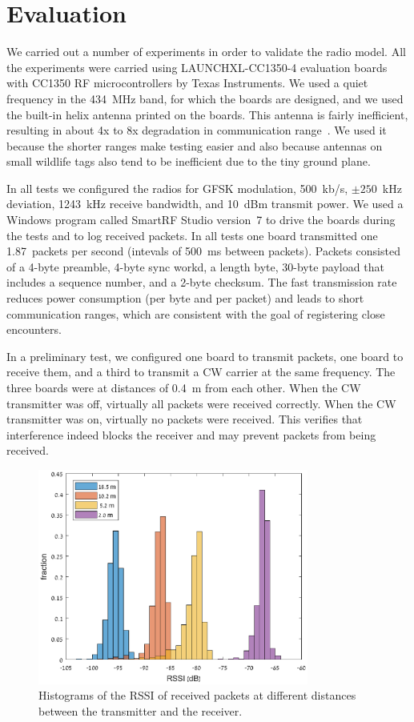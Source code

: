 \section{Evaluation}
\label{sectionsimulation}

We carried out a number of experiments in order to validate the radio model. 
All the experiments were carried using LAUNCHXL-CC1350-4 evaluation boards with CC1350 RF microcontrollers 
by Texas Instruments. We used a quiet frequency in the 434~MHz band, for which the boards are designed,
and we used the built-in helix antenna printed on the boards. This antenna is fairly inefficient, resulting
in about 4x to 8x degradation in communication range~\cite{LAUNCHXL-CC1350-4}. We used it because the shorter 
ranges make testing easier
and also because antennas on small wildlife tags also tend to be inefficient due to the tiny ground plane.

In all tests we configured the radios for GFSK modulation, 500~kb/s, $\pm 250$~kHz deviation, 1243~kHz receive bandwidth,
and 10~dBm transmit power. We used a Windows program called SmartRF Studio version~7 to drive the boards during
the tests and to log received packets. In all tests one board transmitted one 1.87~packets per second (intevals of
500~ms between packets). Packets consisted of a 4-byte preamble, 4-byte sync workd, a length byte, 30-byte payload 
that includes a sequence number, and a 2-byte checksum. The fast transmission rate reduces power consumption (per byte and
per packet) and leads to short communication ranges, which are consistent with the goal of registering close encounters.

In a preliminary test, we configured one board to transmit packets, one board to receive them, and a third to transmit a 
CW carrier at the same frequency. The three boards were at distances of 0.4~m from each other. When the CW transmitter
was off, virtually all packets were received correctly. When the CW transmitter was on, virtually no packets were received.
This verifies that interference indeed blocks the receiver and may prevent packets from being received.

\begin{figure}[h]
    \centering
    \includegraphics[width=3.5in]{experiments/rssiHistograms.eps}
    \caption{Histograms of the RSSI of received packets at different distances between the transmitter and the receiver.}
    \label{fig:rssiHistograms}
\end{figure}

